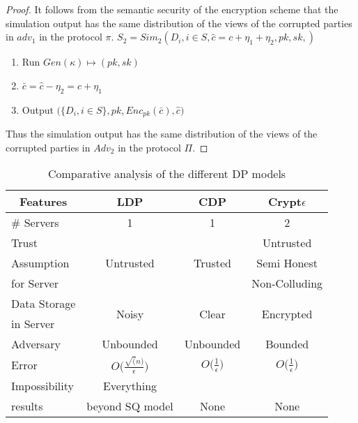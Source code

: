 \begin{proof}
It follows from the semantic security of the encryption scheme that the simulation
output has the same distribution of the views of the corrupted parties in $adv_1$ in the
protocol $\pi$.
$S_2=Sim_2(D_i, i \in S, \hat{c}=c+\eta_1+\eta_2,pk,sk,)$
\begin{enumerate}\item Run $Gen(\kappa)\mapsto (pk,sk)$ \item $\bar{c}=\hat{c}-\eta_2=c+\eta_1$
\item Output $\Big(\{D_i, i \in S\},pk,Enc_{pk}(\bar{c}),\hat{c} \Big)$
\end{enumerate}
Thus the simulation output has the same distribution of the
views of the corrupted parties in $Adv_2$ in the protocol $\Pi$. 


\end{proof}
\begin{table}[h!]
\small
\centering
\caption {Comparative analysis of the different DP models}
 \begin{tabular}{l| c c c}  \toprule
\multicolumn{1}{c}{\textbf{Features}} & \textbf{LDP}  & \textbf{CDP}  & \textbf{Crypt$\epsilon$}  \\ [0.5ex] 
 \midrule \midrule \# Servers & 1& 1 & 2\\\hline
Trust  & & & Untrusted \\  Assumption & Untrusted & Trusted & Semi Honest \\for Server &  &   &  Non-Colluding  \\ \hline
Data Storage & \multirow{2}{*}{Noisy} & \multirow{2}{*}{Clear} & \multirow{2}{*}{Encrypted} \\in Server & &  &  \\\hline
Adversary & Unbounded & Unbounded & Bounded \\\hline
 Error & $O\Big(\frac{\sqrt(n)}{\epsilon}\Big)$& $O\Big(\frac{1}{\epsilon}\Big)$ & $O\Big(\frac{1}{\epsilon}\Big)$\\\hline
 Impossibility & Everything && \\results & beyond SQ model & None & None\footnotemark\\
  [1ex] 
 \bottomrule
 \end{tabular}\label{DPCompare}
\end{table}
